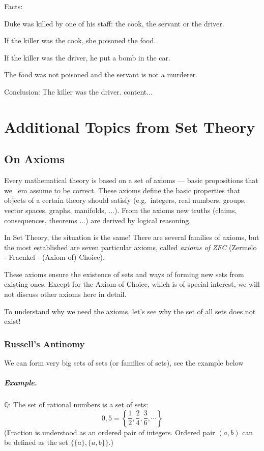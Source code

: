 \documentclass[11pt,paper=b5,footinclude,headinclude]{scrbook} %
\theoremstyle{remark}
\theoremstyle{definition} %
\theoremstyle{theorem} %
\begin{document}
Facts:

Duke was killed by one of his staff: the cook, the servant or the driver.

If the killer was the cook, she poisoned the food.

If the killer was the driver, he put a bomb in the car.

The food was not poisoned and the servant is not a murderer.

Conclusion: The killer was the driver.
	content...

\chapter{Additional Topics from Set Theory}

\section{On Axioms}

Every mathematical theory is based on a set of axioms --- basic propositions that we {\ em assume} to be correct.
These axioms define the basic properties that objects of a certain theory should satisfy (e.g.~integers, real numbers, groups, vector spaces, graphs, manifolds, ...). From the axioms new truths (claims, consequences, theorems ...) are derived by logical reasoning.

In Set Theory, the situation is the same! There are several families of axioms, but the most established are seven particular axioms, called {\em axioms of ZFC} (Zermelo - Fraenkel - (Axiom of) Choice).

These axioms ensure the existence of sets and ways of forming new sets from existing ones.
Except for the Axiom of Choice, which is of special interest, we will not discuss other axioms here in detail.

To understand why we need the axioms, let's see why the set of all sets does not exist!

\subsection*{Russell's Antinomy}

We can form very big sets of sets (or families of sets), see the example below

\paragraph{Example.}  $\mathbb{Q}$: The set of rational numbers is a set of sets:
$$0,5 = \left\{\frac{1}{2}, \frac{2}{4}, \frac{3}{6}, \cdots\right\}$$
(Fraction is understood as an ordered pair of integers. Ordered pair $ (a, b) $ can be defined as the set $\{\{a \}, \{a, b \} \} $.)
\end{document}
